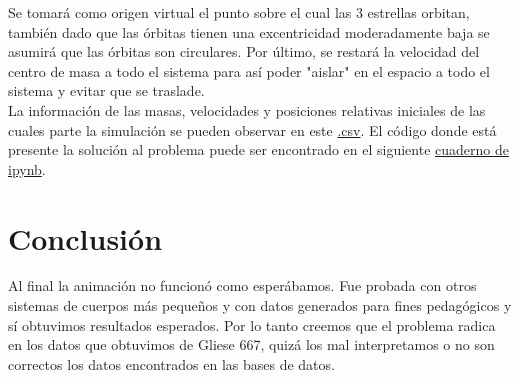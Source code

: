 \documentclass[11pt,a4paper]{article}
\begin{document}
{Se tomará como origen virtual el punto sobre el cual las 3 estrellas orbitan, también dado que las órbitas tienen una excentricidad moderadamente baja se asumirá que las órbitas son circulares. Por último, se restará la velocidad del centro de masa a todo el sistema para así poder "aislar" en el espacio a todo el sistema y evitar que se traslade.\\

La información de las masas, velocidades y posiciones relativas iniciales de las cuales parte la simulación se pueden observar en este \href{https://github.com/diegolramirez/MC/blob/master/Proyecto/datos.csv}{.csv}. El código donde está presente la solución al problema puede ser encontrado en el siguiente \href{https://github.com/diegolramirez/MC/blob/master/Proyecto/proyecto.ipynb}{cuaderno de ipynb}.
}

\section{\label{conc}Conclusión}
{
Al final la animación no funcionó como esperábamos. Fue probada con otros sistemas de cuerpos más pequeños y con datos generados para fines pedagógicos y sí obtuvimos resultados esperados. Por lo tanto creemos que el problema radica en los datos que obtuvimos de Gliese 667, quizá los mal interpretamos o no son correctos los datos encontrados en las bases de datos. 
}
\end{document}
